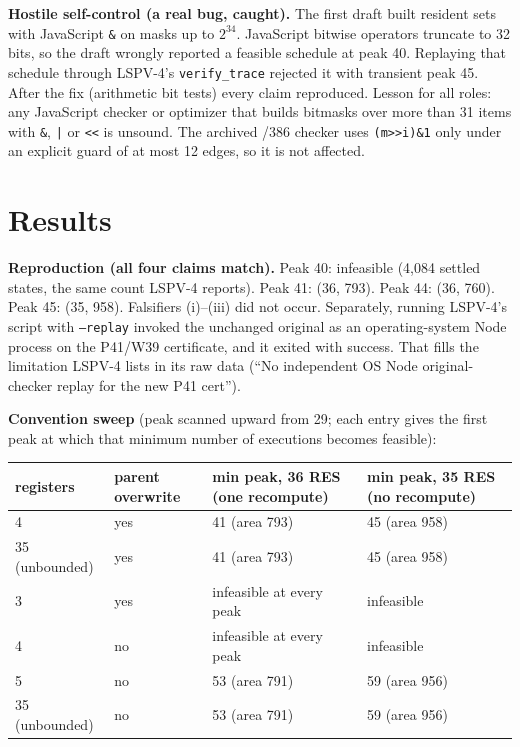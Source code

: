 \documentclass[11pt]{article}
\begin{document}
\textbf{Hostile self-control (a real bug, caught).} The first draft built resident sets with JavaScript \texttt{\&} on masks up to $2^{34}$.  JavaScript bitwise operators truncate to 32 bits, so the draft wrongly reported a feasible schedule at peak 40.  Replaying that schedule through LSPV-4's \texttt{verify\_trace} rejected it with transient peak 45.  After the fix (arithmetic bit tests) every claim reproduced.  Lesson for all roles: any JavaScript checker or optimizer that builds bitmasks over more than 31 items with \texttt{\&}, \texttt{|} or \texttt{<<} is unsound.  The archived /386 checker uses \texttt{(m>>i)\&1} only under an explicit guard of at most 12 edges, so it is not affected.

\section{Results}
\textbf{Reproduction (all four claims match).} Peak 40: infeasible (4,084 settled states, the same count LSPV-4 reports).  Peak 41: (36, 793).  Peak 44: (36, 760).  Peak 45: (35, 958).  Falsifiers (i)--(iii) did not occur.  Separately, running LSPV-4's script with \texttt{--replay} invoked the unchanged original  as an operating-system Node process on the P41/W39 certificate, and it exited with success.  That fills the limitation LSPV-4 lists in its raw data (``No independent OS Node original-checker replay for the new P41 cert'').

\textbf{Convention sweep} (peak scanned upward from 29; each entry gives the first peak at which that minimum number of executions becomes feasible):

\begin{center}
\begin{tabular}{llll}
\toprule
registers & parent overwrite & min peak, 36 RES (one recompute) & min peak, 35 RES (no recompute)\\
\midrule
4 & yes & 41 (area 793) & 45 (area 958)\\
35 (unbounded) & yes & 41 (area 793) & 45 (area 958)\\
3 & yes & infeasible at every peak & infeasible\\
4 & no & infeasible at every peak & infeasible\\
5 & no & 53 (area 791) & 59 (area 956)\\
35 (unbounded) & no & 53 (area 791) & 59 (area 956)\\
\bottomrule
\end{tabular}
\end{center}
\end{document}
